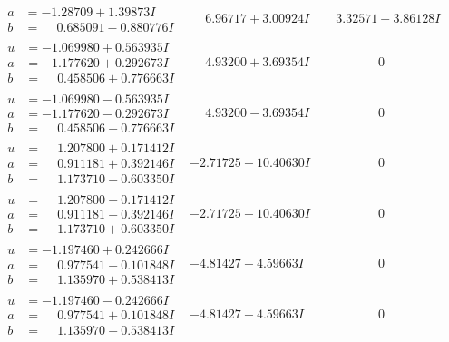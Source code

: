 \documentclass[1p]{elsarticle_modified}
\theoremstyle{definition}
\begin{document}
$$\begin{array}{c|c|c}
\begin{aligned}
a &= -1.28709 + 1.39873 I \\
b &= \phantom{-}0.685091 - 0.880776 I\end{aligned}
 & \phantom{-}6.96717 + 3.00924 I & \phantom{-}3.32571 - 3.86128 I \\ \hline\begin{aligned}
u &= -1.069980 + 0.563935 I \\
a &= -1.177620 + 0.292673 I \\
b &= \phantom{-}0.458506 + 0.776663 I\end{aligned}
 & \phantom{-}4.93200 + 3.69354 I & \phantom{-0.000000 } 0 \\ \hline\begin{aligned}
u &= -1.069980 - 0.563935 I \\
a &= -1.177620 - 0.292673 I \\
b &= \phantom{-}0.458506 - 0.776663 I\end{aligned}
 & \phantom{-}4.93200 - 3.69354 I & \phantom{-0.000000 } 0 \\ \hline\begin{aligned}
u &= \phantom{-}1.207800 + 0.171412 I \\
a &= \phantom{-}0.911181 + 0.392146 I \\
b &= \phantom{-}1.173710 - 0.603350 I\end{aligned}
 & -2.71725 + 10.40630 I & \phantom{-0.000000 } 0 \\ \hline\begin{aligned}
u &= \phantom{-}1.207800 - 0.171412 I \\
a &= \phantom{-}0.911181 - 0.392146 I \\
b &= \phantom{-}1.173710 + 0.603350 I\end{aligned}
 & -2.71725 - 10.40630 I & \phantom{-0.000000 } 0 \\ \hline\begin{aligned}
u &= -1.197460 + 0.242666 I \\
a &= \phantom{-}0.977541 - 0.101848 I \\
b &= \phantom{-}1.135970 + 0.538413 I\end{aligned}
 & -4.81427 - 4.59663 I & \phantom{-0.000000 } 0 \\ \hline\begin{aligned}
u &= -1.197460 - 0.242666 I \\
a &= \phantom{-}0.977541 + 0.101848 I \\
b &= \phantom{-}1.135970 - 0.538413 I\end{aligned}
 & -4.81427 + 4.59663 I & \phantom{-0.000000 } 0 \\ \hline\begin{aligned}

\end{aligned}
\end{array}$$
\end{document}
